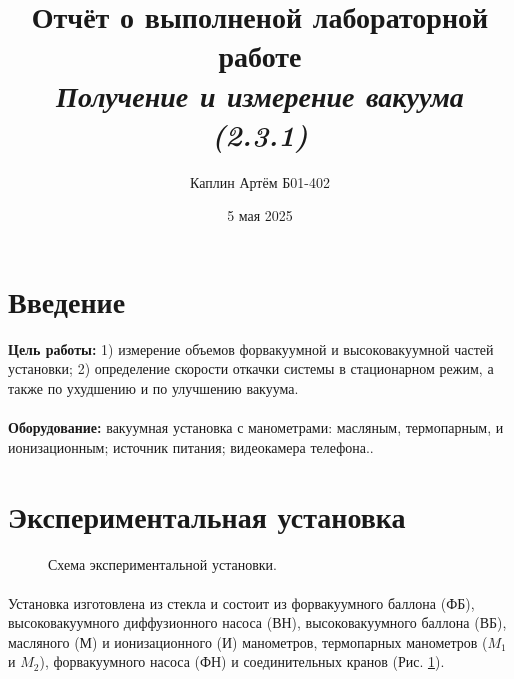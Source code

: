 \documentclass[a4paper,12pt]{article}
\title{\textbf{Отчёт о выполненой лабораторной работе \\ \textit{Получение и измерение вакуума (2.3.1)}}}
\author{Каплин Артём Б01-402}
\date{5 мая 2025}
\begin{document}
\maketitle
	
	\section{Введение}
	
	\textbf{Цель работы:} 1) измерение объемов форвакуумной и высоковакуумной частей установки; 2) определение скорости откачки системы в стационарном режим, а также по ухудшению и по улучшению вакуума.\\
    \\
    \textbf{Оборудование:} вакуумная установка с манометрами: масляным, термопарным, и ионизационным; источник питания; видеокамера телефона..
	
	\section{Экспериментальная установка}

    \begin{figure}[h]
        \caption{Схема экспериментальной установки.}
        \label{ris:ustanovka}
    \end{figure}

    \paragraph{}
    Установка изготовлена из стекла и состоит из форвакуумного баллона (ФБ), высоковакуумного диффузионного насоса (ВН), высоковакуумного баллона (ВБ), масляного (М) и ионизационного (И) манометров, термопарных манометров ($M_1$ и $M_2$), форвакуумного насоса (ФН) и соединительных кранов (Рис. \ref{ris:ustanovka}).
\end{document}
